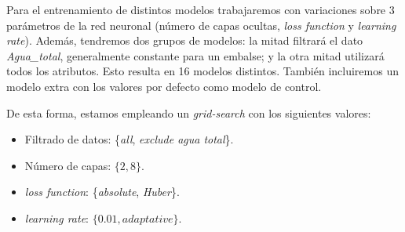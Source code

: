 \documentclass[12pt]{report} %
\begin{document}
        Para el entrenamiento de distintos modelos trabajaremos con variaciones sobre 3 parámetros de la red neuronal (número de capas ocultas, \textit{loss function} y \textit{learning rate}). Además, tendremos dos grupos de modelos: la mitad filtrará el dato \textit{Agua\_total}, generalmente constante para un embalse; y la otra mitad utilizará todos los atributos. Esto resulta en 16 modelos distintos. También incluiremos un modelo extra con los valores por defecto como modelo de control.

        De esta forma, estamos empleando un \textit{grid-search} con los siguientes valores:
        \begin{itemize}
            \item Filtrado de datos: \{\textit{all}, \textit{exclude agua total}\}.
            \item Número de capas: $\{2, 8\}$.
            \item \textit{loss function}: \{\textit{absolute}, \textit{Huber}\}.
            \item \textit{learning rate}: $\{0.01, \textit{adaptative}\}$.
        \end{itemize}
\end{document}
